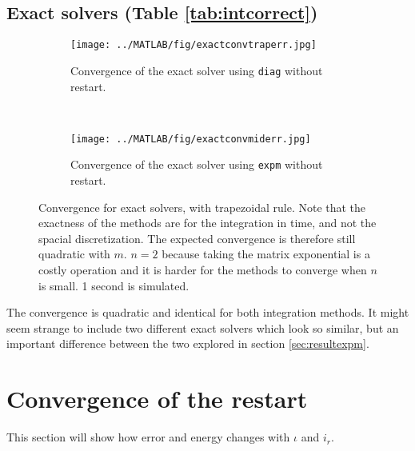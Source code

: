 \subsection{Exact solvers (Table \ref{tab:intcorrect})} %
\label{sec:exactconv}
\begin{figure}[H]
        \centering
        \begin{subfigure}[b]{0.45\textwidth}
                \texttt{[image: ../MATLAB/fig/exactconvtraperr.jpg]}
                \caption{ Convergence of the exact solver using \texttt{diag} without restart. }
                \label{fig:exactconvtraperr}
        \end{subfigure}
        ~
        \begin{subfigure}[b]{0.45\textwidth}
                \texttt{[image: ../MATLAB/fig/exactconvmiderr.jpg]}
                \caption{ Convergence of the exact solver using \texttt{expm} without restart. }  
				\label{fig:exactconvmiderr}
        \end{subfigure}         
       
\caption{Convergence for exact solvers, with trapezoidal rule. Note that the exactness of the methods are for the integration in time, and not the spacial discretization. The expected convergence is therefore still quadratic with $m$. $n = 2$ because taking the matrix exponential is a costly operation and it is harder for the methods to converge when $n$ is small. 1 second is simulated. } %
\label{fig:intexactt}
\end{figure}
The convergence is quadratic and identical for both integration methods. It might seem strange to include two different exact solvers which look so similar, but an important difference between the two explored in section \ref{sec:resultexpm}.

\section{Convergence of the restart}%
This section will show how error and energy changes with $\iota$ and $i_r$.
